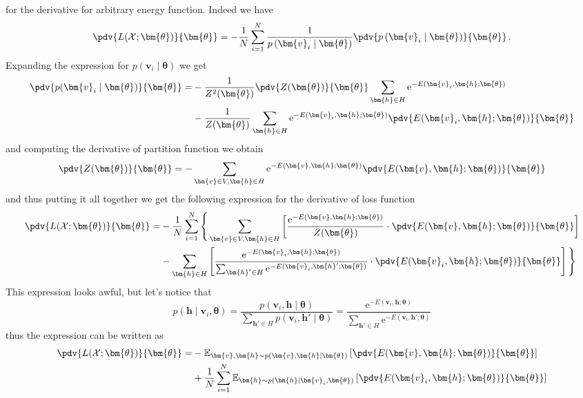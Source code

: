 \documentclass[a5paper]{article}
\newcommand{\e}{\mathrm{e}}
\newcommand{\mc}[1]{\mathcal{#1}}
\begin{document}
for the derivative for arbitrary energy function. Indeed we have
\[
   \pdv{L(\mc{X}; \bm{\theta})}{\bm{\theta}} = - \frac{1}{N} \sum_{i=1}^N \frac{1}{p\left(\bm{v}_i \mid \bm{\theta}\right)} \pdv{p\left(\bm{v}_i \mid \bm{\theta}\right)}{\bm{\theta}}\,.
\]
Expanding the expression for \(p(\bm{v}_i \mid \bm{\theta})\) we get
\[
\begin{split}
   \pdv{p(\bm{v}_i \mid \bm{\theta})}{\bm{\theta}} = &- \frac{1}{Z^2(\bm{\theta})} \pdv{Z(\bm{\theta})}{\bm{\theta}} \sum_{\bm{h} \in H} \e^{-E(\bm{v}_i,\bm{h};\bm{\theta})}\\
   &-\frac{1}{Z(\bm{\theta})} \sum_{\bm{h} \in H} \e^{-E(\bm{v}_i,\bm{h};\bm{\theta})} \pdv{E(\bm{v}_i,\bm{h};\bm{\theta})}{\bm{\theta}}
\end{split}
\]
and computing the derivative of partition function we obtain
\[
   \pdv{Z(\bm{\theta})}{\bm{\theta}} = -\sum_{\bm{v} \in V, \bm{h} \in H} \e^{-E(\bm{v},\bm{h};\bm{\theta})} \pdv{E(\bm{v},\bm{h};\bm{\theta})}{\bm{\theta}}
\]
and thus putting it all together we get the following expression for the derivative of loss function
\[
\begin{split}
   \pdv{L(\mc{X};\bm{\theta})}{\bm{\theta}} = &-\frac{1}{N} \sum_{i=1}^N \Bigg\{ \sum_{\bm{v} \in V, \bm{h} \in H} \left[ \frac{\e^{-E(\bm{v},\bm{h};\bm{\theta})}}{Z(\bm{\theta})} \cdot \pdv{E(\bm{v},\bm{h};\bm{\theta})}{\bm{\theta}} \right] \\
   &- \sum_{\bm{h} \in H} \left[ \frac{\e^{-E(\bm{v}_i,\bm{h};\bm{\theta})}}{\sum_{\bm{h}' \in H} \e^{-E(\bm{v}_i,\bm{h}';\bm{\theta})}} \cdot \pdv{E(\bm{v}_i,\bm{h};\bm{\theta})}{\bm{\theta}} \right] 
   \Bigg\}
\end{split}
\]
This expression looks awful, but let's notice that
\[
   p(\bm{h} \mid \bm{v}_i, \bm{\theta}) = \frac{p(\bm{v}_i, \bm{h} \mid \bm{\theta})}{\sum_{\bm{h}' \in H} p(\bm{v}_i, \bm{h}' \mid \bm{\theta})}
                                      = \frac{\e^{-E(\bm{v}_i,\bm{h};\bm{\theta})}}{\sum_{\bm{h}' \in H} \e^{-E(\bm{v}_i,\bm{h}';\bm{\theta})}}
\]
thus the expression can be written as
\[
   \begin{split}
      \pdv{L(\mc{X};\bm{\theta})}{\bm{\theta}}= &-\mathbb{E}_{\bm{v},\bm{h} \sim p(\bm{v},\bm{h} \mid \bm{\theta})} \left[ \pdv{E(\bm{v},\bm{h};\bm{\theta})}{\bm{\theta}} \right] \\
      &+ \frac{1}{N} \sum_{i=1}^N \mathbb{E}_{\bm{h} \sim p(\bm{h} \mid \bm{v}_i, \bm{\theta})} \left[ \pdv{E(\bm{v}_i, \bm{h}; \bm{\theta})}{\bm{\theta}} \right]
   \end{split}
\]
\end{document}
